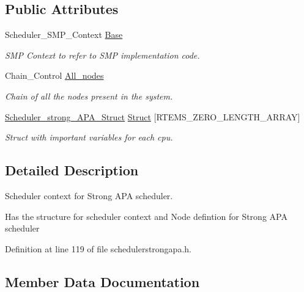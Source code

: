 \subsection*{Public Attributes}
\begin{DoxyCompactItemize}
\item 
Scheduler\+\_\+\+S\+M\+P\+\_\+\+Context \hyperlink{structScheduler__strong__APA__Context_a55755b445b7e7beaf1b87b178521e615}{Base}
\begin{DoxyCompactList}\small\item\em S\+MP Context to refer to S\+MP implementation code. \end{DoxyCompactList}\item 
Chain\+\_\+\+Control \hyperlink{structScheduler__strong__APA__Context_a9bf510496d095d8bca275f35030bb993}{All\+\_\+nodes}
\begin{DoxyCompactList}\small\item\em Chain of all the nodes present in the system. \end{DoxyCompactList}\item 
\hyperlink{structScheduler__strong__APA__Struct}{Scheduler\+\_\+strong\+\_\+\+A\+P\+A\+\_\+\+Struct} \hyperlink{structScheduler__strong__APA__Context_ac25debff84510636df8e42c5750ace15}{Struct} \mbox{[}R\+T\+E\+M\+S\+\_\+\+Z\+E\+R\+O\+\_\+\+L\+E\+N\+G\+T\+H\+\_\+\+A\+R\+R\+AY\mbox{]}
\begin{DoxyCompactList}\small\item\em Struct with important variables for each cpu. \end{DoxyCompactList}\end{DoxyCompactItemize}


\subsection{Detailed Description}
Scheduler context for Strong A\+PA scheduler. 

Has the structure for scheduler context and Node defintion for Strong A\+PA scheduler 

Definition at line 119 of file schedulerstrongapa.\+h.



\subsection{Member Data Documentation}
\mbox{\label{structScheduler__strong__APA__Context_a9bf510496d095d8bca275f35030bb993}} 

